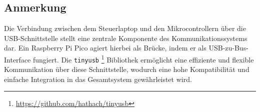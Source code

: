 \subsection{Anmerkung}\label{text:Methodik:Kommunikation:Anmerkung}

Die Verbindung zwischen dem Steuerlaptop und den Mikrocontrollern über die USB-Schnittstelle stellt eine zentrale Komponente des Kommunikationssystems dar. Ein Raspberry Pi Pico agiert hierbei als Brücke, indem er als USB-zu-Bus-Interface fungiert. Die \lstinline{tinyusb} \footnote{\url{https://github.com/hathach/tinyusb}} Bibliothek ermöglicht eine effiziente und flexible Kommunikation über diese Schnittstelle, wodurch eine hohe Kompatibilität und einfache Integration in das Gesamtsystem gewährleistet wird. 

